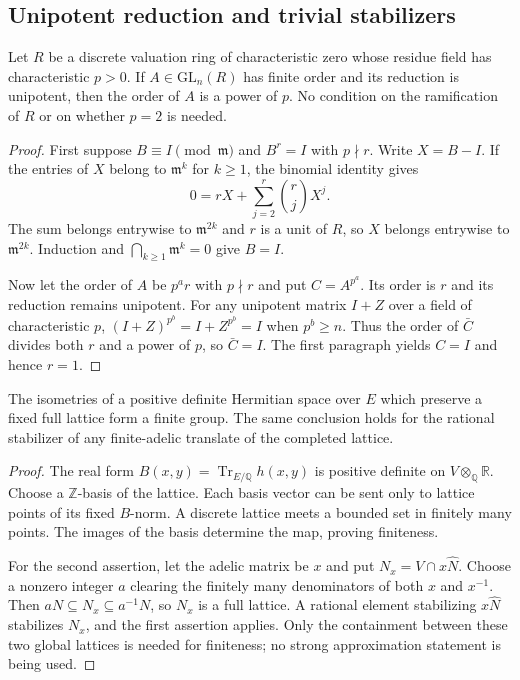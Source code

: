 \subsection{Unipotent reduction and trivial stabilizers}

\begin{lemma}\label{al-local-torsion}
Let $R$ be a discrete valuation ring of characteristic zero whose
residue field has characteristic $p>0$. If $A\in\mathrm{GL}_n(R)$
has finite order and its reduction is unipotent, then the order
of $A$ is a power of $p$. No condition on the ramification of
$R$ or on whether $p=2$ is needed.
\end{lemma}
\begin{proof}
First suppose $B\equiv I\pmod{\mathfrak m}$ and $B^r=I$ with
$p\nmid r$. Write $X=B-I$. If the entries of $X$ belong to
$\mathfrak m^k$ for $k\geq1$, the binomial identity gives
\[
  0=rX+\sum_{j=2}^r\binom rjX^j.
\]
The sum belongs entrywise to $\mathfrak m^{2k}$ and $r$ is a unit
of $R$, so $X$ belongs entrywise to $\mathfrak m^{2k}$.
Induction and $\bigcap_{k\geq1}\mathfrak m^k=0$ give $B=I$.

Now let the order of $A$ be $p^ar$ with $p\nmid r$ and put
$C=A^{p^a}$. Its order is $r$ and its reduction remains unipotent.
For any unipotent matrix $I+Z$ over a field of characteristic $p$,
$(I+Z)^{p^b}=I+Z^{p^b}=I$ when $p^b\geq n$.
Thus the order of $\bar C$ divides both $r$ and a power of $p$,
so $\bar C=I$. The first paragraph yields $C=I$ and hence $r=1$.
\end{proof}

\begin{lemma}\label{al-finite-isometries}
The isometries of a positive definite Hermitian space over $E$
which preserve a fixed full lattice form a finite group.
The same conclusion holds for the rational stabilizer of any
finite-adelic translate of the completed lattice.
\end{lemma}
\begin{proof}
The real form $B(x,y)=\operatorname{Tr}_{E/\mathbb Q}h(x,y)$
is positive definite on $V\otimes_{\mathbb Q}\mathbb R$.
Choose a $\mathbb Z$-basis of the lattice. Each basis vector can
be sent only to lattice points of its fixed $B$-norm. A discrete
lattice meets a bounded set in finitely many points. The images
of the basis determine the map, proving finiteness.

For the second assertion, let the adelic matrix be $x$ and put
$N_x=V\cap x\widehat N$. Choose a nonzero integer $a$ clearing
the finitely many denominators of both $x$ and $x^{-1}$.
Then $aN\subseteq N_x\subseteq a^{-1}N$, so $N_x$ is a full
lattice. A rational element stabilizing $x\widehat N$ stabilizes
$N_x$, and the first assertion applies. Only the containment
between these two global lattices is needed for finiteness;
no strong approximation statement is being used.
\end{proof}

